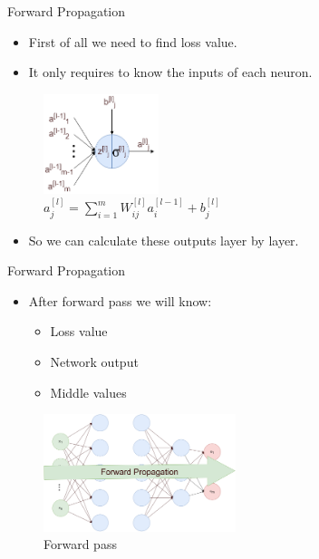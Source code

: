 \documentclass[compress,oilve,t]{beamer}
\begin{document}
\begin{frame}{Forward Propagation}
	\begin{itemize}
		\item First of all we need to find loss value.
		\item It only requires to know the inputs of each neuron.
	\end{itemize}
	\begin{figure}[H]
		\centering
		\includegraphics[width=0.3\textwidth]{Figs/forward_pass.png}
		\caption{$a^{[l]}_j = \sum_{i=1}^m W^{[l]}_{ij}a^{[l-1]}_i + b^{[l]}_j$}
	\end{figure}
	\begin{itemize}
		\item So we can calculate these outputs layer by layer.
	\end{itemize}
\end{frame}

\begin{frame}{Forward Propagation}
	\begin{itemize}
		\item After forward pass we will know:
		\begin{itemize}
			\item Loss value
			\item Network output
			\item Middle values
		\end{itemize}
	\end{itemize}
	\begin{figure}[H]
		\centering
		\includegraphics[width=0.5\textwidth]{Figs/forward_propagation.png}
		\caption{Forward pass}
	\end{figure}
\end{frame}
\end{document}
